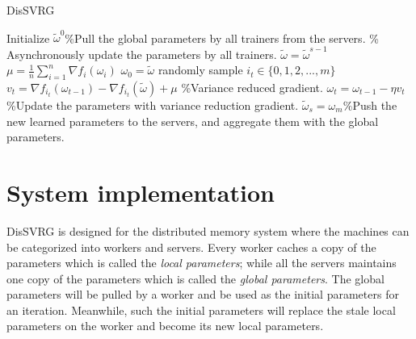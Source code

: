 \documentclass[10pt,journal,finalsubmission,compsoc]{IEEEtran}
\begin{document}
\begin{algorithm}[t]
    \caption{DisSVRG}
    \label{algorithm_dis_svrg}
    \begin{algorithmic}[1]
        \State Initialize $\tilde{\omega}^0$\%Pull the global parameters by all trainers from the servers.
         \% Asynchronously update the parameters by all trainers.
            \State $\tilde{\omega}=\tilde{\omega}^{s-1}$
            \State $\mu=\frac{1}{n}\sum\limits_{i=1}^n\nabla f_i(\omega_i)$
            \State $\omega_0=\tilde{\omega}$
                \State randomly sample $i_t\in\{0,1,2,...,m\}$
                \State $v_t=\nabla f_{i_t}(\omega_{t-1})-\nabla f_{i_t}(\tilde{\omega})+\mu$ \%Variance reduced gradient.
                \State $\omega_t=\omega_{t-1}-\eta v_t$\%Update the parameters with variance reduction gradient.
           \EndFor
           \State $\tilde{\omega}_s=\omega_m$\%Push the new learned parameters to the servers, and aggregate them with the global parameters. 
       \EndFor
    \end{algorithmic}
\end{algorithm}

%

\section{System implementation}
\label{implementation}
DisSVRG is designed for the distributed memory system where the machines can be categorized into workers and servers. Every worker caches a copy of the parameters which is called the \emph{local parameters}; while all the servers maintains one copy of the parameters which is called the \emph{global parameters}. The global parameters will be pulled by a worker and be used as the initial parameters for an iteration. Meanwhile, such the initial parameters will replace the stale local parameters on the worker and become its new local parameters.
\end{document}
